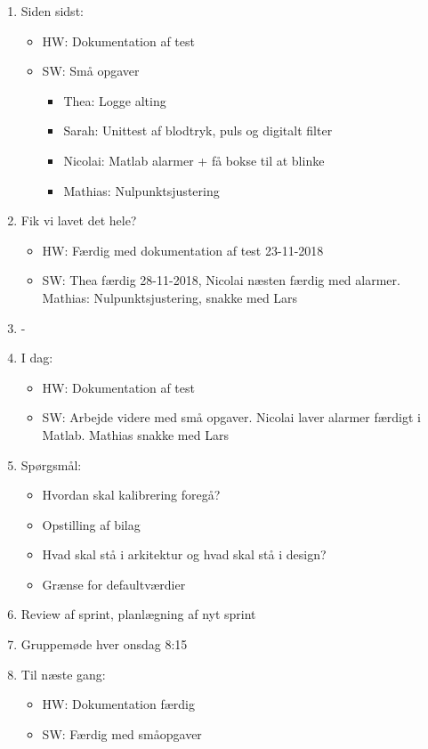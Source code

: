 \begin{enumerate}
	\item Siden sidst:
	\begin{itemize}
		\item HW: Dokumentation af test
		\item SW: Små opgaver
		\begin{itemize}
			\item Thea: Logge alting
			\item Sarah: Unittest af blodtryk, puls og digitalt filter
			\item Nicolai: Matlab alarmer + få bokse til at blinke
			\item Mathias: Nulpunktsjustering
		\end{itemize}
	\end{itemize}
	\item Fik vi lavet det hele?
	\begin{itemize}
		\item HW: Færdig med dokumentation af test 23-11-2018
		\item SW: Thea færdig 28-11-2018, Nicolai næsten færdig med alarmer. Mathias: Nulpunktsjustering, snakke med Lars
	\end{itemize}
	\item -
	\item I dag:
	\begin{itemize}
		\item HW: Dokumentation af test
		\item SW: Arbejde videre med små opgaver. Nicolai laver alarmer færdigt i Matlab. Mathias snakke med Lars
	\end{itemize}
	\item Spørgsmål:
	\begin{itemize}
		\item Hvordan skal kalibrering foregå?
		\item Opstilling af bilag
		\item Hvad skal stå i arkitektur og hvad skal stå i design?
		\item Grænse for defaultværdier
	\end{itemize}
	\item Review af sprint, planlægning af nyt sprint
	\item Gruppemøde hver onsdag 8:15
	\item Til næste gang:
	\begin{itemize}
		\item HW: Dokumentation færdig
		\item SW: Færdig med småopgaver
	\end{itemize}
\end{enumerate}

\clearpage